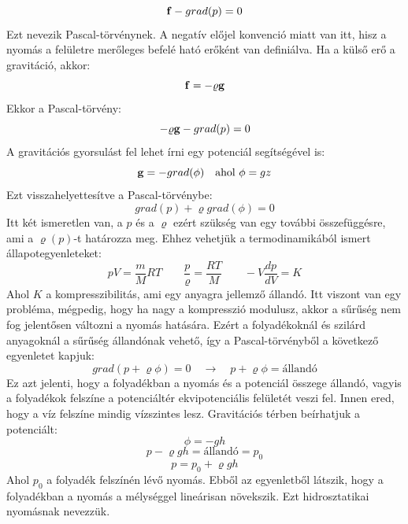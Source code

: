 \documentclass[../main.tex]{subfiles}
\begin{document}
\begin{equation}
    \bold{f} - grad(p) = 0
\end{equation}
Ezt nevezik Pascal-törvénynek. A negatív előjel konvenció miatt van itt, hisz a nyomás a felületre merőleges befelé ható erőként van definiálva.
Ha a külső erő a gravitáció, akkor:
\begin{equation}
    \bold{f} = - \varrho \bold{g}
\end{equation}
Ekkor a Pascal-törvény:
\begin{equation}
    - \varrho \bold{g} - grad(p) = 0
\end{equation}
A gravitációs gyorsulást fel lehet írni egy potenciál segítségével is:
\begin{equation}
    \bold{g} = - grad(\phi) \quad \text{ahol } \phi = gz
\end{equation}
Ezt visszahelyettesítve a Pascal-törvénybe:
\begin{equation}
    grad(p) + \varrho grad(\phi) = 0
\end{equation}
Itt két ismeretlen van, a $p$ és a $\varrho$ ezért szükség van egy további összefüggésre, ami a $\varrho (p)$-t határozza meg.
Ehhez vehetjük a termodinamikából ismert állapotegyenleteket:
\begin{equation}
    pV = \frac{m}{M}RT \quad \quad \frac{p}{\varrho} = \frac{RT}{M} \quad \quad -V \frac{dp}{dV} = K
\end{equation}
Ahol $K$ a kompresszibilitás, ami egy anyagra jellemző állandó. Itt viszont van egy probléma, mégpedig, hogy ha nagy a kompresszió modulusz,
akkor a sűrűség nem fog jelentősen változni a nyomás hatására. Ezért a folyadékoknál és szilárd anyagoknál a sűrűség állandónak vehető,
így a Pascal-törvényből a következő egyenletet kapjuk:
\begin{equation}
    grad(p + \varrho \phi) = 0 \quad \rightarrow \quad p + \varrho \phi = \text{állandó}
\end{equation}
Ez azt jelenti, hogy a folyadékban a nyomás és a potenciál összege állandó, vagyis a folyadékok felszíne a potenciáltér ekvipotenciális felületét veszi fel.
Innen ered, hogy a víz felszíne mindig vízszintes lesz. Gravitációs térben beírhatjuk a potenciált:
\begin{equation}
    \phi = - g h
\end{equation}
\begin{equation}
    p - \varrho g h = \text{állandó} = p_0
\end{equation}
\begin{equation}
    p = p_0 + \varrho g h
\end{equation}
Ahol $p_0$ a folyadék felszínén lévő nyomás. Ebből az egyenletből látszik, hogy a folyadékban a nyomás a mélységgel lineárisan növekszik. Ezt 
hidrosztatikai nyomásnak nevezzük.
\end{document}
